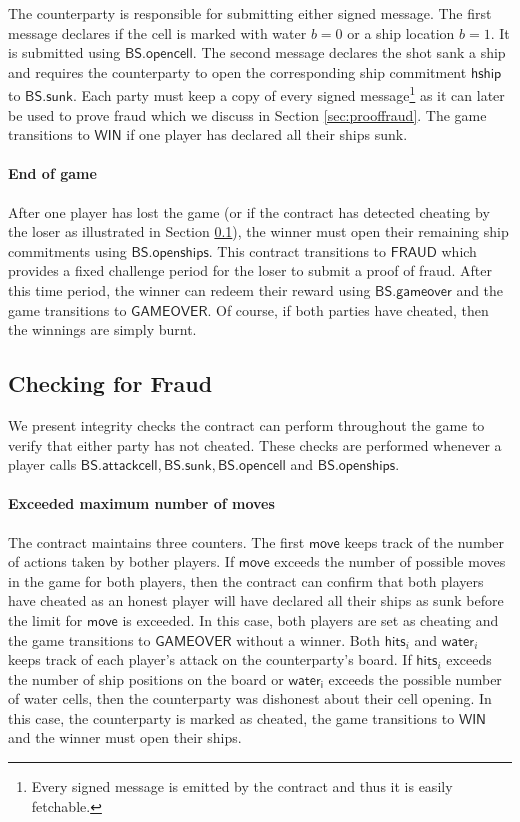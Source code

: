 \documentclass{llncs}
\newcommand{\gamewinner}{\mathsf{WIN}}
\newcommand{\gamefraud}{\mathsf{FRAUD}}
\newcommand{\gamefinished}{\mathsf{GAMEOVER}}
\newcommand{\hship}{\mathsf{hship}}
\newcommand{\battleshipattackcell}{\mathsf{BS.attackcell}}
\newcommand{\battleshiprevealcell}{\mathsf{BS.opencell}}
\newcommand{\battleshipsinking}{\mathsf{BS.sunk}}
\newcommand{\battleshiprevealships}{\mathsf{BS.openships}}
\newcommand{\battleshipgameover}{\mathsf{BS.gameover}}
\begin{document}
The counterparty is responsible for submitting either signed message. 
The first message declares if the cell is marked with water $b=0$ or a ship location $b=1$.
It is submitted using $\battleshiprevealcell$.
The second message declares the shot sank a ship and requires the counterparty to open the corresponding ship commitment $\hship$ to $\battleshipsinking$. 
Each party must keep a copy of every signed message\footnote{Every signed message is emitted by the contract and thus it is easily fetchable.} as it can later be used to prove fraud which we discuss in Section \ref{sec:prooffraud}.
The game transitions to $\gamewinner$ if one player has declared all their ships sunk. 

\paragraph{End of game} 
After one player has lost the game (or if the contract has detected cheating by the loser as illustrated in Section \ref{sec:fraud}), the winner must open their remaining ship commitments using $\battleshiprevealships$.
This contract transitions to $\gamefraud$ which provides a fixed challenge period for the loser to submit a proof of fraud. 
After this time period, the winner can redeem their reward using $\battleshipgameover$  and the game  transitions to $\gamefinished$. 
Of course, if both parties have cheated, then the winnings are simply burnt. 

\subsection{Checking for Fraud} \label{sec:fraud}

We present integrity checks the contract can perform throughout the game to verify that either party has not cheated. 
These checks are performed whenever a player calls $\battleshipattackcell, \battleshipsinking, \battleshiprevealcell$ and $\battleshiprevealships$.


\paragraph{Exceeded maximum number of moves} 
The contract maintains three counters.
The first $\mathsf{move}$ keeps track of the number of actions taken by bother players.
If $\mathsf{move}$ exceeds the number of possible moves in the game for both players, then the contract can confirm that both players have cheated as an honest player will have declared all their ships as sunk before the limit for $\mathsf{move}$ is exceeded.
In this case, both players are set as cheating and the game transitions to $\gamefinished$ without a winner. 
Both $\mathsf{hits}_{i}$ and $\mathsf{water}_{i}$ keeps track of each player's attack on the counterparty's board. 
If $\mathsf{hits}_{i}$ exceeds the number of ship positions on the board or $\mathsf{water_{i}}$ exceeds the possible number of water cells, then the counterparty was dishonest about their cell opening. 
In this case, the counterparty is marked as cheated, the game transitions to $\gamewinner$ and the winner must open their ships.  
\end{document}
